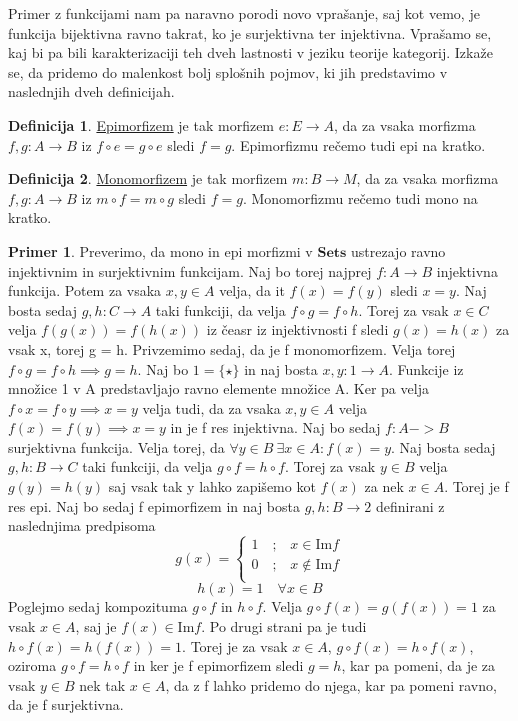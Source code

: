 \documentclass[12pt,a4paper]{book}
\theoremstyle{definition}
\newtheorem{definicija}{Definicija}[chapter]
\theoremstyle{plain}
\theoremstyle{definition}
\newtheorem{primer}{Primer}[section]
\theoremstyle{remark}
\newcommand{\cat}[1]{\textbf{#1}}
\begin{document}
Primer z funkcijami nam pa naravno porodi novo vprašanje, saj kot vemo, je funkcija bijektivna ravno takrat, ko je surjektivna ter injektivna. Vprašamo se, kaj bi pa bili karakterizaciji teh dveh lastnosti v jeziku teorije kategorij. Izkaže se, da pridemo do malenkost bolj splošnih pojmov, ki jih predstavimo v naslednjih dveh definicijah.

\begin{definicija}
\underline{Epimorfizem} je tak morfizem $e : E \to A$, da za vsaka morfizma $f,g : A \to B$ iz $f \circ e = g \circ e$ sledi $f = g$. Epimorfizmu rečemo tudi epi na kratko.
\end{definicija}

\begin{definicija}
\underline{Monomorfizem} je tak morfizem $m : B \to M$, da za vsaka morfizma $f,g : A \to B$ iz $m \circ f = m \circ g$ sledi $f = g$. Monomorfizmu rečemo tudi mono na kratko.
\end{definicija}

\begin{primer}
Preverimo, da mono in epi morfizmi v $\cat{Sets}$ ustrezajo ravno injektivnim in surjektivnim funkcijam. Naj bo torej najprej $f : A \to B$ injektivna funkcija. Potem za vsaka $x,y \in A$ velja, da it $f(x) = f(y)$ sledi $x = y$. Naj bosta sedaj $g,h : C \to A$ taki funkciji, da velja $f \circ g = f \circ h$. Torej za vsak $x \in C$ velja $f(g(x)) = f(h(x))$ iz čeasr iz injektivnosti f sledi $g(x) = h(x)$ za vsak x, torej g = h. Privzemimo sedaj, da je f monomorfizem. Velja torej $f \circ g = f \circ h \implies g = h$. Naj bo $1 = \{\star\}$ in naj bosta $x,y : 1 \to A$. Funkcije iz množice 1 v A predstavljajo ravno elemente množice A. Ker pa velja $f \circ x = f \circ y \implies x = y$ velja tudi, da za vsaka $x,y \in A$ velja $f(x) = f(y) \implies x = y$ in je f res injektivna. Naj bo sedaj $f : A -> B$ surjektivna funkcija. Velja torej, da $\forall y \in B \ \exists x \in A : f(x) = y$. Naj bosta sedaj $g,h : B \to C$ taki funkciji, da velja $g \circ f = h \circ f$. Torej za vsak $y \in B$ velja $g(y) = h(y)$ saj vsak tak y lahko zapišemo kot $f(x)$ za nek $x \in A$. Torej je f res epi. Naj bo sedaj f epimorfizem in naj bosta $g,h : B \to 2$ definirani z naslednjima predpisoma
\[
g(x)=
\begin{cases}
1 \quad\text{;}\quad x \in \mathrm{Im}f \\
0 \quad\text{;}\quad x \notin \mathrm{Im}f \\
\end{cases}
\]
$$ h(x) = 1 \quad \forall x \in B $$
Poglejmo sedaj kompozituma $g \circ f$ in $h \circ f$. Velja $g \circ f(x) = g(f(x)) = 1$ za vsak $x \in A$, saj je $f(x) \in \mathrm{Im}f$. Po drugi strani pa je tudi $h \circ f(x) = h(f(x)) = 1$. Torej je za vsak $x \in A$, $g \circ f(x) = h \circ f(x)$, oziroma $g\circ f = h\circ f$ in ker je f epimorfizem sledi $g = h$, kar pa pomeni, da je za vsak $y \in B$ nek tak $x \in A$, da z f lahko pridemo do njega, kar pa pomeni ravno, da je f surjektivna.
\end{primer}
\end{document}
